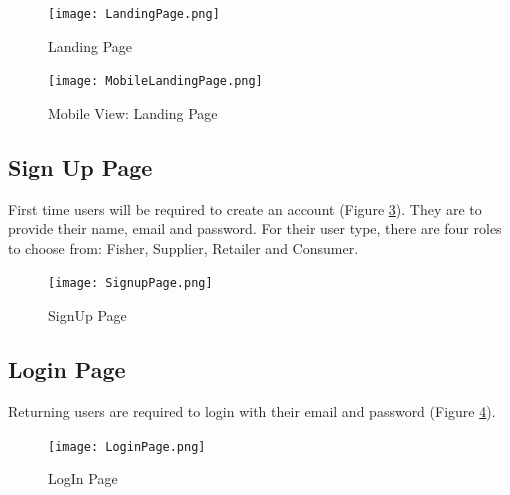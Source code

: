 \begin{figure}[H]
	\centering
	\texttt{[image: LandingPage.png]}
	\caption{Landing Page}
	\label{fig:landing_page}
\end{figure}

\begin{figure}[H]
	\centering
	\texttt{[image: MobileLandingPage.png]}
	\caption{Mobile View: Landing Page}
	\label{fig:mobile_landing_page}
\end{figure}	

\subsection{Sign Up Page}
First time users will be required to create an account (Figure \ref{fig:signup_page}). They are to provide their name, email and password. For their user type, there are four roles to choose from: Fisher, Supplier, Retailer and Consumer. 

\begin{figure}[H]
	\centering
	\texttt{[image: SignupPage.png]}
	\caption{SignUp Page}
	\label{fig:signup_page}
\end{figure}

\subsection{Login Page}
Returning users are required to login with their email and password (Figure \ref{fig:login_page}).

\begin{figure}[H]
	\centering
	\texttt{[image: LoginPage.png]}
	\caption{LogIn Page}
	\label{fig:login_page}
\end{figure}

